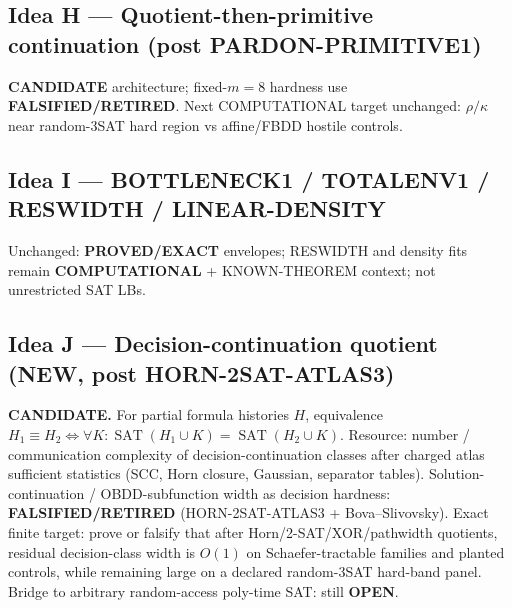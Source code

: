 \documentclass[11pt]{article}
\begin{document}
\subsection*{Idea H --- Quotient-then-primitive continuation (post PARDON-PRIMITIVE1)}
\textbf{CANDIDATE} architecture; fixed-$m=8$ hardness use \textbf{FALSIFIED/RETIRED}.
Next COMPUTATIONAL target unchanged: $\rho/\kappa$ near random-3SAT hard region vs
affine/FBDD hostile controls.

\subsection*{Idea I --- BOTTLENECK1 / TOTALENV1 / RESWIDTH / LINEAR-DENSITY}
Unchanged: \textbf{PROVED/EXACT} envelopes; RESWIDTH and density fits remain
\textbf{COMPUTATIONAL} + KNOWN-THEOREM context; not unrestricted SAT LBs.

\subsection*{Idea J --- Decision-continuation quotient (NEW, post HORN-2SAT-ATLAS3)}
\textbf{CANDIDATE.} For partial formula histories $H$, equivalence
$H_1\equiv H_2\iff\forall K:\operatorname{SAT}(H_1\cup K)=\operatorname{SAT}(H_2\cup K)$.
Resource: number / communication complexity of decision-continuation classes after
charged atlas sufficient statistics (SCC, Horn closure, Gaussian, separator tables).
Solution-continuation / OBDD-subfunction width as decision hardness:
\textbf{FALSIFIED/RETIRED} (HORN-2SAT-ATLAS3 + Bova--Slivovsky).
Exact finite target: prove or falsify that after Horn/2-SAT/XOR/pathwidth quotients,
residual decision-class width is $O(1)$ on Schaefer-tractable families and planted
controls, while remaining large on a declared random-3SAT hard-band panel.
Bridge to arbitrary random-access poly-time SAT: still \textbf{OPEN}.
\end{document}
